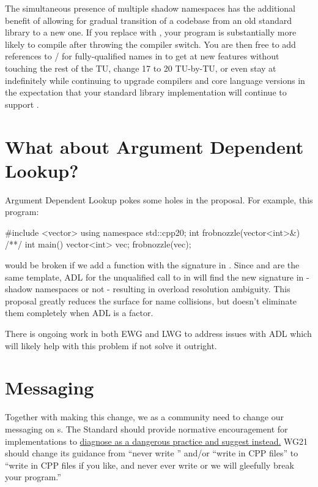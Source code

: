 The simultaneous presence of multiple shadow namespaces has the additional
benefit of allowing for gradual transition of a codebase from an old standard
library to a new one. If you replace  with
, your program is substantially more likely
to compile after throwing the  compiler switch. You are then free to
add references to /  for fully-qualified names
in  to get at new features without touching the rest of the TU,
change 17 to 20 TU-by-TU, or even stay at  indefinitely while
continuing to upgrade compilers and core language versions in the expectation
that your standard library implementation will continue to support
.

\section{What about Argument Dependent Lookup?}
Argument Dependent Lookup pokes some holes in the
proposal. For example, this  program:
\begin{codeblock}
#include <vector>
using namespace std::cpp20;
int frobnozzle(vector<int>&) { /**/ }
int main() {
  vector<int> vec;
  frobnozzle(vec);
}
\end{codeblock}
would be broken if we add a function with the signature
 in . Since
 and  are the same template, ADL
for the unqualified call to  in  will find the
new signature in  - shadow namespaces or not - resulting in overload
resolution ambiguity. This proposal greatly reduces the surface for name
collisions, but doesn't eliminate them completely when ADL is a factor.

There is ongoing work in both EWG and LWG to address issues with ADL which will
likely help with this problem if not solve it outright.

\section{Messaging}
Together with making this change, we as a community need to change our messaging
on s. The Standard should provide normative
encouragement for implementations to
\href{https://i.imgflip.com/2n1mwr.jpg}{diagnose 
as a dangerous practice and suggest 
instead.} WG21 should change its guidance from ``never write '' and/or ``write  in CPP files'' to
``write  in CPP files if you like, and never
ever write  or we will gleefully break your program.''

